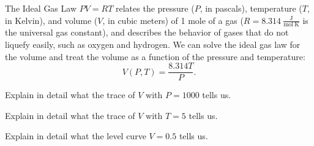 
\begin{activity} \label{A:9.1.10}
The Ideal Gas Law $PV = RT$ relates the pressure ($P$, in pascals), temperature ($T$, in Kelvin), and volume ($V$, in cubic meters) of 1 mole of a gas ($R =  8.314 \ \frac{\text{J}}{\text{mol} \ \text{K}}$ is the universal gas constant), and describes the behavior of gases that do not liquefy easily, such as oxygen and hydrogen. We can solve the ideal gas law for the volume and treat the volume as a function of the pressure and temperature:
\[V(P,T) = \frac{8.314T}{P}.\]
    \ba
    \item Explain in detail what the trace of $V$ with $P=1000$ tells us.
    \item Explain in detail what the trace of $V$ with $T=5$ tells us.
    \item Explain in detail what the level curve $V = 0.5$ tells us.
    \ea
\end{activity}
\begin{smallhint}

\end{smallhint}
\begin{bighint}

\end{bighint}
\begin{activitySolution}


\end{activitySolution}


\aftera 